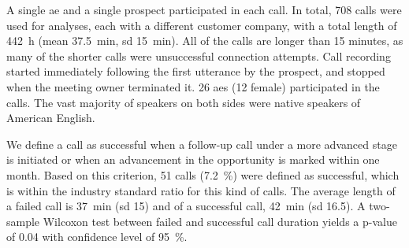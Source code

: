 A single \ac{ae} and a single prospect participated in each call.
In total, 708 calls were used for analyses, each with a different customer company, with a total length of \SI{442}{\hour} (mean \SI{37.5}{\minute}, \ac{sd} \SI{15}{\minute}).
All of the calls are longer than 15 minutes, as many of the shorter calls were unsuccessful connection attempts.
Call recording started immediately following the first utterance by the prospect, and stopped when the meeting owner terminated it.
26 \acp{ae} (12 female) participated in the calls.
The vast majority of speakers on both sides were native speakers of American English.

We define a call as successful when a follow-up call under a more advanced stage is initiated or when an advancement in the opportunity is marked within one month.
Based on this criterion, 51 calls (\SI{7.2}{\percent}) were defined as successful, which is within the industry standard ratio for this kind of calls.
The average length of a failed call is \SI{37}{\minute} (\ac{sd} 15) and of a successful call, \SI{42}{\minute} (\ac{sd} 16.5).
A two-sample Wilcoxon test \cite{Wilcoxon1945individual} between failed and successful call duration yields a p-value of 0.04 with confidence level of \SI{95}{\percent}.


